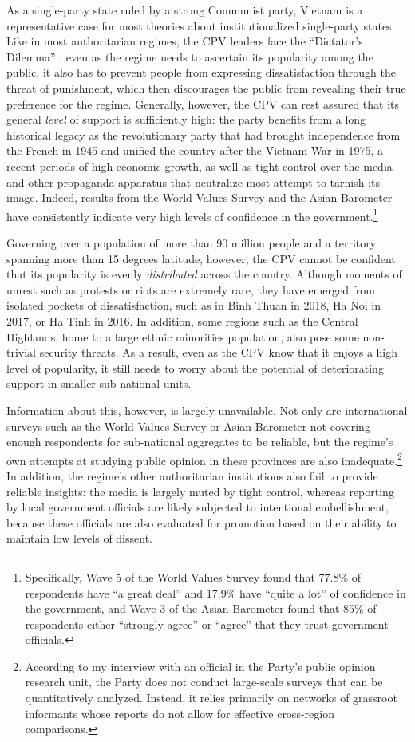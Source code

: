 \documentclass[12pt]{article}
\newcommand{\1}{\mathbbm{1}}
\begin{document}
As a single-party state ruled by a strong Communist party, Vietnam is a representative case for most theories about institutionalized single-party states. Like in most authoritarian regimes, the CPV leaders face the ``Dictator's Dilemma'' \citep{Wintrobe2000}: even as the regime needs to ascertain its popularity among the public, it also has to prevent people from expressing dissatisfaction through the threat of punishment, which then discourages the public from revealing their true preference for the regime. Generally, however, the CPV can rest assured that its general \textit{level} of support is sufficiently high: the party benefits from a long historical legacy as the revolutionary party that had brought independence from the French in 1945 and unified the country after the Vietnam War in 1975, a recent periods of high economic growth, as well as tight control over the media and other propaganda apparatus that neutralize most attempt to tarnish its image. Indeed, results from the World Values Survey \citeyearpar{wvs} and the Asian Barometer \citeyearpar{abs} have consistently indicate very high levels of confidence in the government.\footnote{Specifically, Wave 5 of the World Values Survey \citeyearpar{wvs} found that 77.8\% of respondents have ``a great deal'' and 17.9\% have ``quite a lot'' of confidence in the government, and Wave 3 of the Asian Barometer \citeyearpar{abs} found that 85\% of respondents either ``strongly agree'' or ``agree'' that they trust government officials.}

Governing over a population of more than 90 million people and a territory spanning more than 15 degrees latitude, however, the CPV cannot be confident that its popularity is evenly \textit{distributed} across the country. Although moments of unrest such as protests or riots are extremely rare, they have emerged from isolated pockets of dissatisfaction, such as in Binh Thuan in 2018, Ha Noi in 2017, or Ha Tinh in 2016. In addition, some regions such as the Central Highlands, home to a large ethnic minorities population, also pose some non-trivial security threats. As a result, even as the CPV know that it enjoys a high level of popularity, it still needs to worry about the potential of deteriorating support in smaller sub-national units. 

Information about this, however, is largely unavailable. Not only are international surveys such as the World Values Survey or Asian Barometer not covering enough respondents for sub-national aggregates to be reliable, but the regime's own attempts at studying public opinion in these provinces are also inadequate.\footnote{According to my interview with an official in the Party's public opinion research unit, the Party does not conduct large-scale surveys that can be quantitatively analyzed. Instead, it relies primarily on networks of grassroot informants whose reports do not allow for effective cross-region comparisons.} In addition, the regime's other authoritarian institutions also fail to provide reliable insights: the media is largely muted by tight control, whereas reporting by local government officials are likely subjected to intentional embellishment, because these officials are also evaluated for promotion based on their ability to maintain low levels of dissent.
\end{document}
